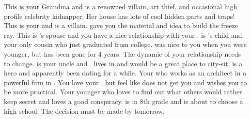 \documentclass[char]{LRSguildcamp1}
\begin{document}
\begin{itemz}[Notes]
	\item 
\end{itemz}
\begin{contacts}
	\contact{\cGrandma{}} This is your Grandma and is a renowned villain, art thief, and occasional high profile celebrity kidnapper. Her house has lots of cool hidden parts and traps!
	\contact{\cOldest{}} This is your  \cOldest{\uncle} and is a villain.  gave you the material and idea to build the freeze ray.
	\contact{\cOS{}} This is \cOldest{}'s spouse and you have a nice relationship with your \cOS{\uncle}.
	\contact{\cGrad{}} \cGrad{} is \cOldest{}'s child and your only cousin who just graduated from college. \cGrad{} was nice to you when you were younger, but has been gone for 4 years. The dynamic of your relationship needs to change. 
	\contact{\cYoungest{}} \cYoungest{} is your uncle and \cYoungest{\hero}. \cYoungest{} lives in \pCityYoungest{} and would be a great place to city-sit.  
	\contact{\cYS{}} \cYS{} is a hero and apparently been dating \cYoungest{} for a while. 
	\contact{\cArchitect{}} Your \cArchitect{\parent} who works as an architect in a powerful firm in \pCityArchitect{}.  You love your \cArchitect{\parent}, but feel like \cArchitect{\they} does not get you and wishes you to be more practical. 
	 	\contact{\cTween{}} Your younger \cTween{\sibling} who loves to find out what others would rather keep secret and loves a good conspiracy. \cTween{} is in 8th grade and is about to choose a high school. The decision must be made by tomorrow. 
\end{contacts}
\end{document}
